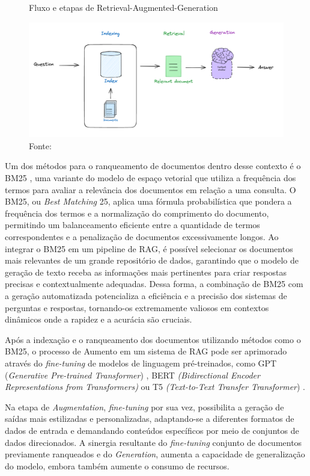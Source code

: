 \begin{figure}[H]
    \centering
    \caption{Fluxo e etapas de Retrieval-Augmented-Generation}
    \includegraphics[width=\linewidth]{img/RAG/RAG2.png}
    \caption*{Fonte: \cite{SlidesMartin}}
    \label{fig:rag12}
\end{figure}

 Um dos métodos para o ranqueamento de documentos dentro desse contexto é o BM25 \cite{10.1145/2682862.2682863}, uma variante do modelo de espaço vetorial que utiliza a frequência dos termos para avaliar a relevância dos documentos em relação a uma consulta. O BM25, ou \textit{Best Matching} 25, aplica uma fórmula probabilística que pondera a frequência dos termos e a normalização do comprimento do documento, permitindo um balanceamento eficiente entre a quantidade de termos correspondentes e a penalização de documentos excessivamente longos. Ao integrar o BM25 em um pipeline de RAG, é possível selecionar os documentos mais relevantes de um grande repositório de dados, garantindo que o modelo de geração de texto receba as informações mais pertinentes para criar respostas precisas e contextualmente adequadas. Dessa forma, a combinação de BM25 com a geração automatizada potencializa a eficiência e a precisão dos sistemas de perguntas e respostas, tornando-os extremamente valiosos em contextos dinâmicos onde a rapidez e a acurácia são cruciais.

Após a indexação e o ranqueamento dos documentos utilizando métodos como o BM25, o processo de Aumento em um sistema de RAG pode ser aprimorado através do \textit{fine-tuning} de modelos de linguagem pré-treinados, como GPT (\textit{Generative Pre-trained Transformer}) \cite{Liu_2023}, BERT \textit{(Bidirectional Encoder Representations from Transformers)} \cite{DBLP:journals/corr/abs-1810-04805} ou T5 \textit{(Text-to-Text Transfer Transformer}) \cite{2020t5}.

Na etapa de \textit{Augmentation}, \textit{fine-tuning} por sua vez, possibilita a geração de saídas mais estilizadas e personalizadas, adaptando-se a diferentes formatos de dados de entrada e demandando conteúdos específicos por meio de conjuntos de dados direcionados. A sinergia resultante do \textit{fine-tuning} conjunto de documentos previamente ranqueados e do \textit{Generation}, aumenta a capacidade de generalização do modelo, embora também aumente o consumo de recursos. 

